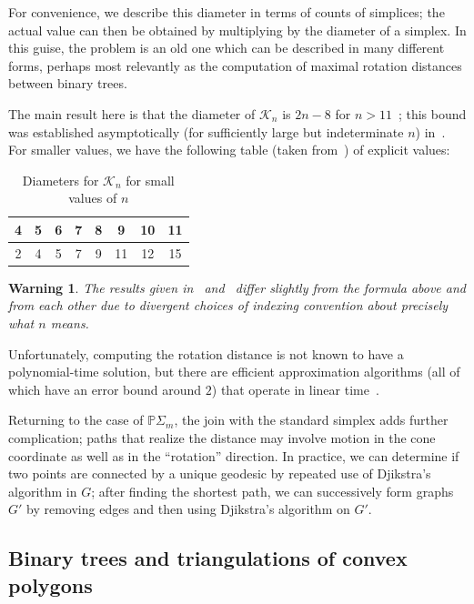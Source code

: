 \documentclass[a4paper,11pt]{article}
\newtheorem{warning}[theorem]{Warning}
\newcommand{\aK}{\mathcal{K}}
\begin{document}
For convenience, we describe this diameter in terms of counts of simplices; the actual value can then be obtained by multiplying by the diameter of a simplex.
In this guise, the problem is an old one which can be described in many different forms, perhaps most relevantly as the computation of maximal rotation distances between binary trees.

The main result here is that the diameter of $\aK_n$ is $2n - 8$ for $n > 11$~\cite{pournin2014diameter}; this bound was established asymptotically (for sufficiently large but indeterminate $n$) in~\cite{sleator1988rotation}.
For smaller values, we have the following table (taken from~\cite[\S2.3]{sleator1988rotation}) of explicit values:

\begin{table}[ht]
    \caption{Diameters for $\aK_n$ for small values of $n$}
    \centering
    \begin{tabular}{c c c c c c c c}
    \hline\hline
    4 & 5 & 6 & 7 & 8 & 9 & 10 & 11 \\
    \hline
    2 & 4 & 5 & 7 & 9 & 11 & 12 & 15 \\
    \hline
    \end{tabular}
\end{table}

\begin{warning}
The results given in~\cite{pournin2014diameter} and~\cite{sleator1988rotation} differ slightly from the formula above and from each other due to divergent choices of indexing convention about precisely what $n$ means.
\end{warning}

Unfortunately, computing the rotation distance is not known to have a polynomial-time solution, but there are efficient approximation algorithms (all of which have an error bound around $2$) that operate in linear time~\cite{cleary2010linear}.

Returning to the case of $\mathbb{P}\Sigma_m$, the join with the standard simplex adds further complication; paths that realize the distance may involve motion in the cone coordinate as well as in the ``rotation'' direction.
In practice, we can determine if two points are connected by a unique geodesic by repeated use of Djikstra's algorithm in $G$; after finding the shortest path, we can successively form graphs $G'$ by removing edges and then using Djikstra's algorithm on $G'$.

\subsection{Binary trees and triangulations of convex polygons}
\end{document}
